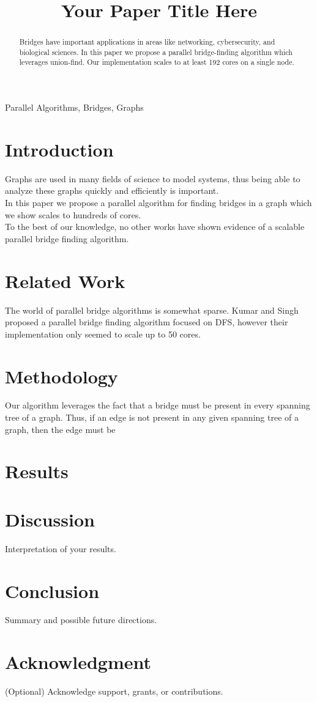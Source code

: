 \documentclass[conference]{IEEEtran}
\title{Your Paper Title Here}
\author{
\IEEEauthorblockN{Keegan Smith}
\IEEEauthorblockA{
\textit{Computer Science} \\
\textit{Texas A\&M University} \\
College Station TX, United States \\
keeganasmith2003@tamu.edu
}
}
\begin{document}
\maketitle

\begin{abstract}
Bridges have important applications in areas like networking, cybersecurity, and biological sciences. In this paper we propose a parallel bridge-finding algorithm which leverages union-find. Our implementation scales to at least 192 cores on a single node. 
\end{abstract}

\begin{IEEEkeywords}
Parallel Algorithms, Bridges, Graphs
\end{IEEEkeywords}

\section{Introduction}
Graphs are used in many fields of science to model systems, thus being able to analyze these graphs quickly and efficiently is important. \\
In this paper we propose a parallel algorithm for finding bridges in a graph which we show scales to hundreds of cores. \\
To the best of our knowledge, no other works have shown evidence of a scalable parallel bridge finding algorithm.
\section{Related Work}
The world of parallel bridge algorithms is somewhat sparse. Kumar and Singh ~\cite{kumar2021efficient} proposed a parallel bridge finding algorithm focused on DFS, however their implementation only seemed to scale up to 50 cores.
\section{Methodology}
Our algorithm leverages the fact that a bridge must be present in every spanning tree of a graph. Thus, if an edge is not present in any given spanning tree of a graph, then the edge must be 
\section{Results}

\section{Discussion}
Interpretation of your results.

\section{Conclusion}
Summary and possible future directions.

\section*{Acknowledgment}
(Optional) Acknowledge support, grants, or contributions.



\end{document}
